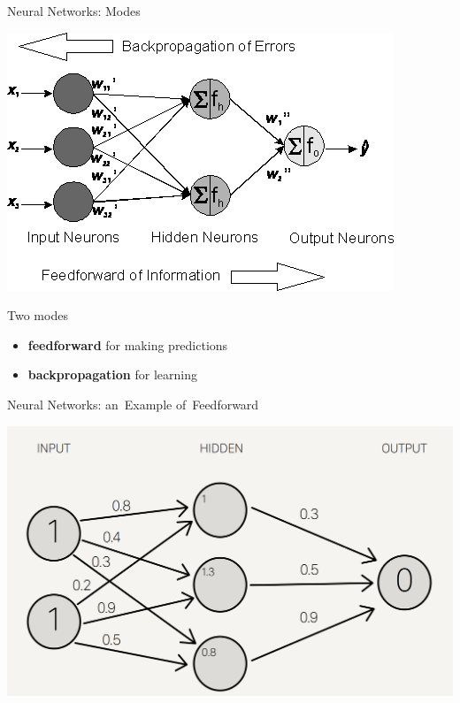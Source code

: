 \documentclass{beamer}
\begin{document}
  {
    \begin{frame}{Neural Networks: Modes}
      \begin{center}
        \includegraphics[height=.6\textheight]{../img/neural_network_forward_and_backprop.png}
      \end{center}

      \pause
      Two modes
      \pause
      \begin{itemize}[<+- | alert@+>]
        \item \textbf{feedforward} for making predictions
        \item \textbf{backpropagation} for learning
      \end{itemize}
    \end{frame}
  }

  {
    \begin{frame}{Neural Networks: an~Example of~Feedforward}
      \begin{center}
        \includegraphics[width=\textwidth]{../img/feed_forward_example.png}
      \end{center}
    \end{frame}
  }
\end{document}
